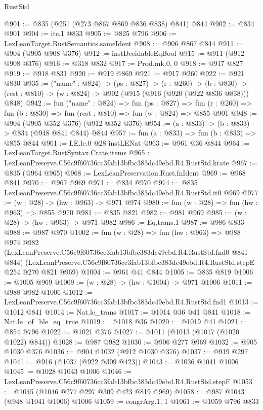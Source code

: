 \begin{lexlean}{RustStd}
\begin{coremodule}
@901 := @835 (@251 (@273 @867 @869 @836 @838) @841) @844
@902 := @834 @901
@904 := ite.{1} @833
@905 := @825 @796
@906 := LexLeanTarget.RustSemantics.sameIdent
@908 := @906 @867 @844
@911 := @904 (@905 @908 @376)
@912 := instDecidableEqBool
@915 := @911 (@912 @908 @376)
@916 := @318 @832
@917 := Prod.mk.{0, 0}
@918 := @917 @827
@919 := @918 @831
@920 := @919 @869
@921 := @917 @260
@922 := @921 @830
@935 := ("name" : @824) ->
  (ps : @827) ->
  (r : @260) ->
  (b : @830) -> (rest : @810) -> (w : @824) -> @902 (@915 (@916 (@920 (@922 @836 @838))) @848)
@942 := fun ("name" : @824) =>
  fun (ps : @827) =>
  fun (r : @260) => fun (b : @830) => fun (rest : @810) => fun (w : @824) => @855 @901
@948 := @904 (@905 @352 @376) (@912 @352 @376)
@954 := (a : @833) -> (b : @833) -> @834 (@948 @841 @844) @844
@957 := fun (a : @833) => fun (b : @833) => @855 @844
@961 := LE.le.{0} @28 instLENat
@963 := @961 @36 @844
@964 := LexLeanTarget.RustSyntax.Crate.items
@965 := LexLeanPreserve.C56c9f60736cc3fab13bfbc383dc49ebd.R4.RustStd.krate
@967 := @835 (@964 @965)
@968 := LexLeanPreservation.Rust.fnIdent
@969 := @968 @841
@970 := @967 @969
@971 := @834 @970
@974 := @835 LexLeanPreserve.C56c9f60736cc3fab13bfbc383dc49ebd.R4.RustStd.it0 @969
@977 := (w : @28) -> (hw : @963) -> @971 @974
@980 := fun (w : @28) => fun (hw : @963) => @855 @970
@981 := @835 @821
@982 := @981 @969
@985 := (w : @28) -> (hw : @963) -> @971 @982
@986 := Eq.trans.{1}
@987 := @986 @833
@988 := @987 @970
@1002 := fun (w : @28) =>
  fun (hw : @963) =>
  @988
    @974
    @982
    (LexLeanPreserve.C56c9f60736cc3fab13bfbc383dc49ebd.R4.RustStd.fnd0 @841 @844)
    (LexLeanPreserve.C56c9f60736cc3fab13bfbc383dc49ebd.R4.RustStd.stepE @254 @270 @821 @969)
@1004 := @961 @41 @844
@1005 := @835 @819
@1006 := @1005 @969
@1009 := (w : @28) -> (hw : @1004) -> @971 @1006
@1011 := @988 @982 @1006
@1012 := LexLeanPreserve.C56c9f60736cc3fab13bfbc383dc49ebd.R4.RustStd.fnd1
@1013 := @1012 @841
@1014 := Nat.le_trans
@1017 := @1014 @36 @41 @841
@1018 := Nat.le_of_ble_eq_true
@1019 := @1018 @36
@1020 := @1019 @41
@1021 := @854 @796
@1022 := @1021 @376
@1027 := @1011 (@1013 (@1017 (@1020 @1022) @844))
@1028 := @987 @982
@1030 := @906 @277 @969
@1032 := @905 @1030 @376
@1036 := @904 @1032 (@912 @1030 @376)
@1037 := @919 @297
@1041 := @916 (@1037 (@922 @309 @423))
@1043 := @1036 @1041 @1006
@1045 := @1028 @1043 @1006
@1046 := LexLeanPreserve.C56c9f60736cc3fab13bfbc383dc49ebd.R4.RustStd.stepF
@1053 := @1045 (@1046 @277 @297 @309 @423 @819 @969)
@1058 := @987 @1043 (@948 @1041 @1006) @1006
@1059 := congrArg.{1, 1}
@1061 := @1059 @796 @833

\end{coremodule}
\end{lexlean}
